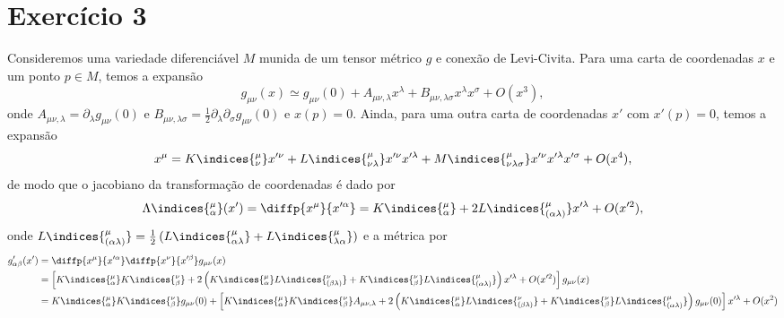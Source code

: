 \section*{Exercício 3}

Consideremos uma variedade diferenciável \(M\) munida de um tensor métrico \(g\) e conexão de Levi-Civita. Para uma carta de coordenadas \(x\) e um ponto \(p \in M\), temos a expansão
\begin{equation*}
    g_{\mu\nu}(x) \simeq g_{\mu\nu}(0) + A_{\mu\nu,\lambda}x^\lambda + B_{\mu\nu, \lambda\sigma}x^\lambda x^\sigma + O(x^3),
\end{equation*}
onde \(A_{\mu\nu,\lambda} = \partial_\lambda g_{\mu\nu}(0)\) e \(B_{\mu\nu,\lambda\sigma} = \frac12\partial_\lambda \partial_\sigma g_{\mu\nu}(0)\) e \(x(p) = 0\). Ainda, para uma outra carta de coordenadas \(x'\) com \(x'(p) = 0\), temos a expansão
\begin{equation*}
    x^\mu = K\indices{^\mu_\nu}x'^\nu + L\indices{^\mu_{\nu\lambda}}x'^\nu x'^\lambda + M\indices{^\mu_{\nu\lambda\sigma}}x'^\nu x'^\lambda x'^\sigma + O(x^4),
\end{equation*}
de modo que o jacobiano da transformação de coordenadas é dado por
\begin{equation*}
    \Lambda\indices{^\mu_\alpha}(x') = \diffp{x^\mu}{x'^\alpha} = K\indices{^\mu_\alpha} + 2L\indices{^\mu_{(\alpha\lambda)}}x'^\lambda + O(x'^2),
\end{equation*}
onde \(L\indices{^\mu_{(\alpha\lambda)}} = \frac12 \left(L\indices{^\mu_{\alpha\lambda}} + L\indices{^\mu_{\lambda\alpha}}\right)\) e a métrica por
\begin{align*}
    g'_{\alpha\beta}(x') &= \diffp{x^\mu}{x'^\alpha}\diffp{x^\nu}{x'^\beta}g_{\mu\nu}(x) \\
                         &= \left[K\indices{^\mu_\alpha}K\indices{^\nu_\beta} + 2\left(K\indices{^\mu_\alpha}L\indices{^\nu_{(\beta\lambda)}} + K\indices{^\nu_\beta}L\indices{^\mu_{(\alpha\lambda)}}\right)x'^\lambda + O(x'^2)\right]g_{\mu\nu}(x)\\
                         &= K\indices{^\mu_\alpha}K\indices{^\nu_\beta}g_{\mu\nu}(0) + \left[K\indices{^\mu_\alpha}K\indices{^\nu_\beta}A_{\mu\nu,\lambda} + 2\left(K\indices{^\mu_\alpha}L\indices{^\nu_{(\beta\lambda)}} + K\indices{^\nu_\beta}L\indices{^\mu_{(\alpha\lambda)}}\right)g_{\mu\nu}(0)\right]x'^\lambda + O(x^2)
\end{align*}
